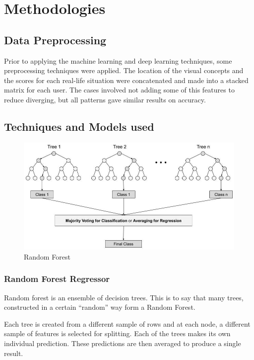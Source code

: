 \documentclass{llncs}
\begin{document}
\section{Methodologies}
\subsection{Data Preprocessing} 
Prior to applying the machine learning and deep learning techniques, some preprocessing techniques were applied. The location of the visual concepts and the scores for each real-life situation were concatenated and made into a stacked matrix for each user. The cases involved not adding some of this features to reduce diverging, but all patterns gave similar results on accuracy.

\subsection{Techniques and Models used}
\label{Model1Architecture}

\begin{figure}[h]
    \centering
    \includegraphics[width=\textwidth,height=\textheight,keepaspectratio]{Random_forest.jpg}
    \caption{Random Forest}
    \label{fig:Model}
\end{figure}


\subsubsection{Random Forest Regressor}
Random forest is an ensemble of decision trees. This is to say that many trees, constructed in a certain “random” way form a Random Forest. 

Each tree is created from a different sample of rows and at each node, a different sample of features is selected for splitting. 
Each of the trees makes its own individual prediction. 
These predictions are then averaged to produce a single result. 
\end{document}
